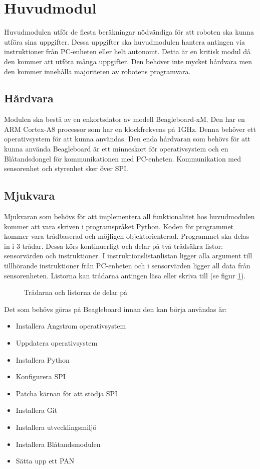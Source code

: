 \setcounter{secnumdepth}{5}
\section{Huvudmodul}
Huvudmodulen utför de flesta beräkningar nödvändiga för att roboten ska kunna utföra sina uppgifter. Dessa uppgifter ska huvudmodulen hantera antingen via instruktioner från PC-enheten eller helt autonomt. Detta är en kritisk modul då den kommer att utföra många uppgifter. Den behöver inte mycket hårdvara men den kommer innehålla majoriteten av robotens programvara.

\subsection{Hårdvara}
Modulen ska bestå av en enkortsdator av modell Beagleboard-xM. Den har en ARM Cortex-A8 processor som har en klockfrekvens på 1GHz. Denna behöver ett operativsystem för att kunna användas. Den enda hårdvaran som behövs för att kunna använda Beagleboard är ett minneskort för operativsystem och en Blåtandsdongel för kommunikationen med PC-enheten. Kommunikation med sensorenhet och styrenhet sker över SPI.

\subsection{Mjukvara}
Mjukvaran som behövs för att implementera all funktionalitet hos huvudmodulen kommer att vara skriven i programspråket Python. Koden för programmet kommer vara trådbaserad och möjligen objektorienterad.
\newline
Programmet ska delas in i 3 trådar. Dessa körs kontinuerligt och delar på två trådsäkra listor: sensorvärden och instruktioner. I instruktionslistanlistan ligger alla argument till tillhörande instruktioner från PC-enheten och i sensorvärden ligger all data från sensorenheten. Listorna kan trådarna antingen läsa eller skriva till (se figur \ref{designspec:huvudmodul-tradar}).

\begin{figure}[h]
\scalebox{0.8}{}
\caption{Trådarna och listorna de delar på} \label{designspec:huvudmodul-tradar}
\end{figure}

Det som behövs göras på Beagleboard innan den kan börja användas är:
\begin{itemize}
\item Installera Angstrom operativsystem
\item Uppdatera operativsystem
\item Installera Python
\item Konfigurera SPI
\item Patcha kärnan för att stödja SPI
\item Installera Git
\item Installera utvecklingsmiljö
\item Installera Blåtandsmodulen
\item Sätta upp ett PAN
\end{itemize}

